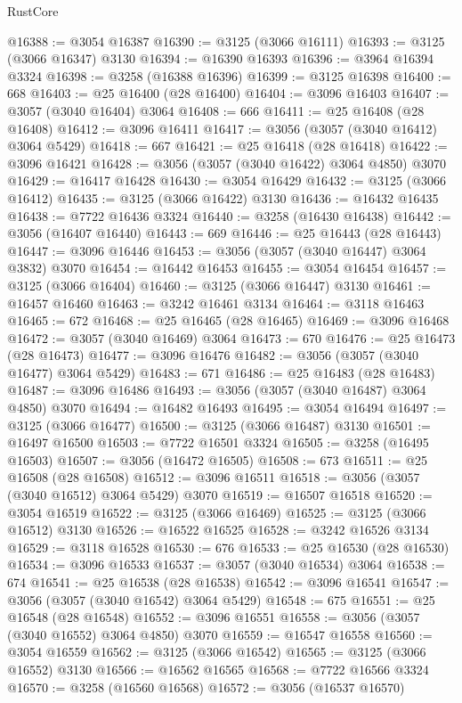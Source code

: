 \begin{lexlean}{RustCore}
\begin{coremodule}
@16388 := @3054 @16387
@16390 := @3125 (@3066 @16111)
@16393 := @3125 (@3066 @16347) @3130
@16394 := @16390 @16393
@16396 := @3964 @16394 @3324
@16398 := @3258 (@16388 @16396)
@16399 := @3125 @16398
@16400 := 668
@16403 := @25 @16400 (@28 @16400)
@16404 := @3096 @16403
@16407 := @3057 (@3040 @16404) @3064
@16408 := 666
@16411 := @25 @16408 (@28 @16408)
@16412 := @3096 @16411
@16417 := @3056 (@3057 (@3040 @16412) @3064 @5429)
@16418 := 667
@16421 := @25 @16418 (@28 @16418)
@16422 := @3096 @16421
@16428 := @3056 (@3057 (@3040 @16422) @3064 @4850) @3070
@16429 := @16417 @16428
@16430 := @3054 @16429
@16432 := @3125 (@3066 @16412)
@16435 := @3125 (@3066 @16422) @3130
@16436 := @16432 @16435
@16438 := @7722 @16436 @3324
@16440 := @3258 (@16430 @16438)
@16442 := @3056 (@16407 @16440)
@16443 := 669
@16446 := @25 @16443 (@28 @16443)
@16447 := @3096 @16446
@16453 := @3056 (@3057 (@3040 @16447) @3064 @3832) @3070
@16454 := @16442 @16453
@16455 := @3054 @16454
@16457 := @3125 (@3066 @16404)
@16460 := @3125 (@3066 @16447) @3130
@16461 := @16457 @16460
@16463 := @3242 @16461 @3134
@16464 := @3118 @16463
@16465 := 672
@16468 := @25 @16465 (@28 @16465)
@16469 := @3096 @16468
@16472 := @3057 (@3040 @16469) @3064
@16473 := 670
@16476 := @25 @16473 (@28 @16473)
@16477 := @3096 @16476
@16482 := @3056 (@3057 (@3040 @16477) @3064 @5429)
@16483 := 671
@16486 := @25 @16483 (@28 @16483)
@16487 := @3096 @16486
@16493 := @3056 (@3057 (@3040 @16487) @3064 @4850) @3070
@16494 := @16482 @16493
@16495 := @3054 @16494
@16497 := @3125 (@3066 @16477)
@16500 := @3125 (@3066 @16487) @3130
@16501 := @16497 @16500
@16503 := @7722 @16501 @3324
@16505 := @3258 (@16495 @16503)
@16507 := @3056 (@16472 @16505)
@16508 := 673
@16511 := @25 @16508 (@28 @16508)
@16512 := @3096 @16511
@16518 := @3056 (@3057 (@3040 @16512) @3064 @5429) @3070
@16519 := @16507 @16518
@16520 := @3054 @16519
@16522 := @3125 (@3066 @16469)
@16525 := @3125 (@3066 @16512) @3130
@16526 := @16522 @16525
@16528 := @3242 @16526 @3134
@16529 := @3118 @16528
@16530 := 676
@16533 := @25 @16530 (@28 @16530)
@16534 := @3096 @16533
@16537 := @3057 (@3040 @16534) @3064
@16538 := 674
@16541 := @25 @16538 (@28 @16538)
@16542 := @3096 @16541
@16547 := @3056 (@3057 (@3040 @16542) @3064 @5429)
@16548 := 675
@16551 := @25 @16548 (@28 @16548)
@16552 := @3096 @16551
@16558 := @3056 (@3057 (@3040 @16552) @3064 @4850) @3070
@16559 := @16547 @16558
@16560 := @3054 @16559
@16562 := @3125 (@3066 @16542)
@16565 := @3125 (@3066 @16552) @3130
@16566 := @16562 @16565
@16568 := @7722 @16566 @3324
@16570 := @3258 (@16560 @16568)
@16572 := @3056 (@16537 @16570)

\end{coremodule}
\end{lexlean}
